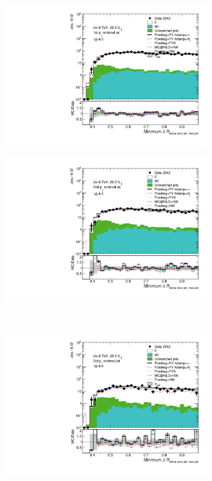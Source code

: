 \begin{figure}
\centering
\begin{subfigure}[]{0.45\textwidth}
\includegraphics[width=\textwidth]{fig/MCComp/NLO/GrandPtVsRecoDRJet0.pdf}
\end{subfigure}
\begin{subfigure}[]{0.45\textwidth}
\includegraphics[width=\textwidth]{fig/MCComp/NLO/GrandPtVsRecoDRJet1.pdf}
\end{subfigure}
\\
\begin{subfigure}[]{0.45\textwidth}
\includegraphics[width=\textwidth]{fig/MCComp/NLO/GrandPtVsRecoDRJet2.pdf}

\end{subfigure}
\end{figure}
